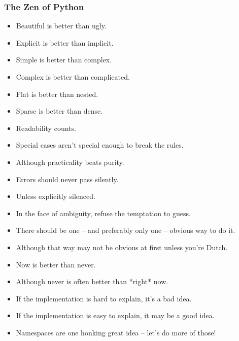 \begin{frame}[fragile]
\frametitle{The Zen of Python}
\begin{itemize}
\tiny
\item Beautiful is better than ugly.
\item Explicit is better than implicit.
\item Simple is better than complex.
\item Complex is better than complicated.
\item Flat is better than nested.
\item Sparse is better than dense.
\item Readability counts.
\item Special cases aren't special enough to break the rules.
\item Although practicality beats purity.
\item Errors should never pass silently.
\item Unless explicitly silenced.
\item In the face of ambiguity, refuse the temptation to guess.
\item There should be one -- and preferably only one -- obvious way to do it.
\item Although that way may not be obvious at first unless you're Dutch.
\item Now is better than never.
\item Although never is often better than *right* now.
\item If the implementation is hard to explain, it's a bad idea.
\item If the implementation is easy to explain, it may be a good idea.
\item Namespaces are one honking great idea -- let's do more of those! 
\end{itemize}

\end{frame}